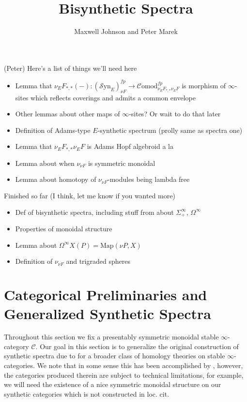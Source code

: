 \documentclass[10pt]{amsart}
\theoremstyle{definition}
\numberwithin{figure}{section}
\numberwithin{equation}{section}
\newcommand{\cC}{\mathcal{C}}
\theoremstyle{cited}
\newcommand{\Map}{\mathrm{Map}}
\newcommand{\Syn}{\mathcal{S}\mathrm{yn}}
\newcommand{\Comod}{\mathcal{C}\mathrm{omod}}
\begin{document}
\title{Bisynthetic Spectra}
\author{Maxwell Johnson and Peter Marek}

\maketitle

(Peter) Here's a list of things we'll need here
\begin{itemize}
    \item Lemma that $\nu_EF_{*,*}(-):(\Syn_E)_{\nu F}^{fp}\to\Comod_{\nu_EF_{*,*}\nu_EF}^{fp}$ is morphism of $\infty$-sites which reflects coverings and admits a common envelope
    \item Other lemmas about other maps of $\infty$-sites? Or wait to do that later
    \item Definition of Adams-type $E$-synthetic spectrum (prolly same as spectra one)
    \item Lemma that $\nu_EF_{*,*}\nu_EF$ is Adams Hopf algebroid a la \cite[Def. 3.1]{Pst22}
    \item Lemma about when $\nu_{\nu F}$ is symmetric monoidal
    \item Lemma about homotopy of $\nu_{\nu F}$-modules being lambda free
\end{itemize}
Finished so far (I think, let me know if you wanted more)

\begin{itemize}
  \item Def of bisynthetic spectra, including stuff from \cite{Pst22} about $\Sigma_+^\infty$, $\Omega^\infty$
  \item Properties of monoidal structure
  \item Lemma about $\Omega^\infty X(P)=\Map(\nu P, X)$
  \item Definition of $\nu_{\nu F}$ and trigraded spheres
\end{itemize}

\section{Categorical Preliminaries and Generalized Synthetic Spectra}

Throughout this section we fix a presentably symmetric monoidal stable $\infty$-category $\cC$. Our goal in this section is to generalize the original construction of synthetic spectra due to \cite{Pst22} for a broader class of homology theories on stable $\infty$-categories. We note that in some sense this has been accomplished by \cite{todo}, however, the categories produced therein are subject to technical limitations, for example, we will need the existence of a nice symmetric monoidal structure on our synthetic categories which is not constructed in loc. cit.
\end{document}
